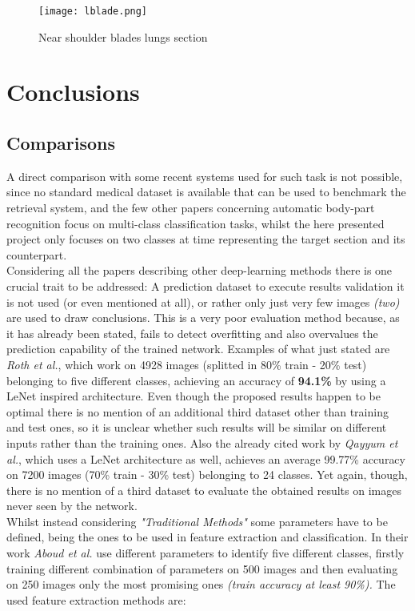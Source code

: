 \documentclass[../main.tex]{subfiles}
\begin{document}
\begin{figure}[h!b]
	\centering
	\texttt{[image: lblade.png]}
	\caption{Near shoulder blades lungs section}
	\label{fig:lungblade}
\end{figure}

\section{Conclusions}

\subsection{Comparisons}
A direct comparison with some recent systems used for such task is not possible, since no standard medical dataset is available that can be used to benchmark the retrieval system,\cite{Qayyum2017} and the few other papers concerning automatic body-part recognition focus on multi-class classification tasks, whilst the here presented project only focuses on two classes at time representing the target section and its counterpart.\\
Considering all the papers describing other deep-learning methods there is one crucial trait to be addressed: A prediction dataset to execute results validation it is not used (or even mentioned at all)\cite{Qayyum2017}, or rather only just very few images \textit{(two)} are used to draw conclusions\cite{Lakhani2018}. This is a very poor evaluation method because, as it has already been stated, fails to detect overfitting and also overvalues the prediction capability of the trained network. Examples of what just stated are \textit{Roth et al.}, which work on 4928 images (splitted in 80\% train - 20\% test) belonging to five different classes, achieving an accuracy of \textbf{94.1\%} by using a LeNet inspired architecture.\cite{Roth2015} Even though the proposed results happen to be optimal there is no mention of an additional third dataset other than training and test ones, so it is unclear whether such results will be similar on different inputs rather than the training ones. Also the already cited work by \textit{Qayyum et al.}, which uses a LeNet architecture as well, achieves an average 99.77\% accuracy on 7200 images (70\% train - 30\% test) belonging to 24 classes. Yet again, though, there is no mention of a third dataset to evaluate the obtained results on images never seen by the network.\cite{Qayyum2017}\\
Whilst instead considering \textit{"Traditional Methods"} some parameters have to be defined, being the ones to be used in feature extraction and classification. In their work \textit{Aboud et al.}\cite{Aboud2015} use different parameters to identify five different classes, firstly training different combination of parameters on 500 images and then evaluating on 250 images only the most promising ones \textit{(train accuracy at least 90\%).} The used feature extraction methods are:
\end{document}
